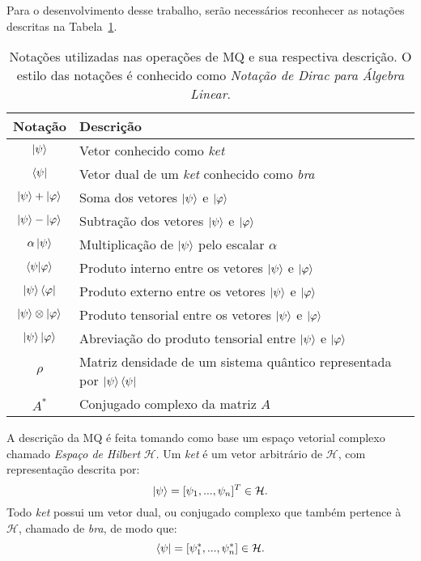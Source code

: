 Para o desenvolvimento desse trabalho, serão necessários reconhecer as notações descritas na Tabela~\ref{tab:notação}.

\begin{table}[ht!]
  \centering
  \caption{Notações utilizadas nas operações de MQ e sua respectiva descrição. O estilo das notações é conhecido como \textit{Notação de Dirac para Álgebra Linear}.}\label{tab:notação}
  \begin{tabular}{cl}
    \toprule
    Notação                   & Descrição                                                   \\
    \midrule
    $\ket{\psi}$                       & Vetor conhecido como \textit{ket}                                    \\
    $\bra{\psi}$                       & Vetor dual de um \textit{ket} conhecido como \textit{bra}            \\
    $\ket{\psi} + \ket{\varphi}$       & Soma dos vetores $\ket{\psi}$ e $\ket{\varphi}$  \\
    $\ket{\psi} - \ket{\varphi}$       & Subtração dos vetores $\ket{\psi}$ e $\ket{\varphi}$  \\
    $\alpha \ket{\psi}$                & Multiplicação de $\ket{\psi}$ pelo escalar $\alpha$ \\
    $\braket{\psi|\varphi}$            & Produto interno entre os vetores $\ket{\psi}$ e $\ket{\varphi}$      \\
    $\ket{\psi}\bra{\varphi}$          & Produto externo entre os vetores $\ket{\psi}$ e $\ket{\varphi}$ \\
    $\ket{\psi} \otimes \ket{\varphi}$ & Produto tensorial entre os vetores $\ket{\psi}$ e $\ket{\varphi}$    \\
    $\ket{\psi}\ket{\varphi}$          & Abreviação do produto tensorial entre $\ket{\psi}$ e $\ket{\varphi}$ \\
    $\rho$                             & Matriz densidade de um sistema quântico representada por $\ket{\psi}\bra{\psi}$ \\
    $A^*$                              & Conjugado complexo da matriz \(A\)                                   \\
    \bottomrule
  \end{tabular}
\end{table}

A descrição da MQ é feita tomando como base um espaço vetorial complexo chamado \textit{Espaço de Hilbert} $\mathcal{H}$. Um \textit{ket} é um vetor arbitrário de $\mathcal{H}$, com representação descrita por:
\begin{equation}\label{eq:ketpsi}
  \ket{\psi} = [\psi_1,...,\psi_n]^{T} \in \mathcal{H}.
\end{equation}
Todo \textit{ket} possui um vetor dual, ou conjugado complexo que também pertence à $\mathcal{H}$, chamado de \textit{bra}, de modo que:
\begin{equation}\label{eq:brapsi}
  \bra{\psi} = [\psi_1^*,...,\psi_n^*] \in \mathcal{H}.
\end{equation}

